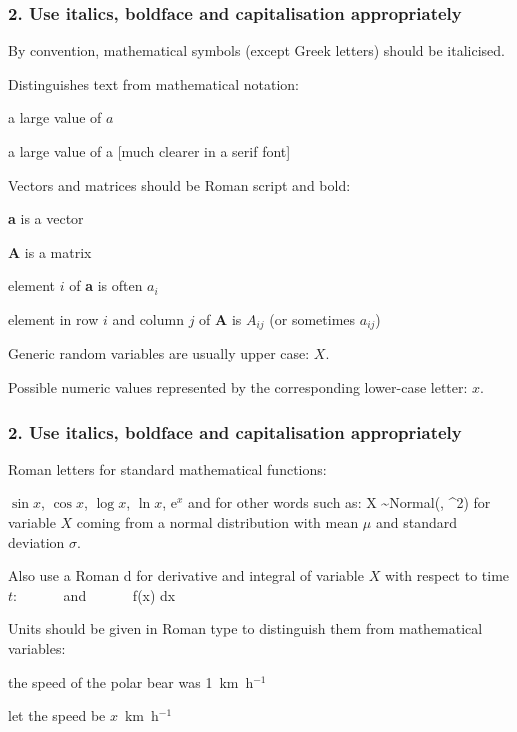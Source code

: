 

\begin{frame}
\frametitle{2. Use italics, boldface and capitalisation appropriately}

By convention, mathematical symbols (except Greek letters) should be italicised.

Distinguishes text from mathematical notation:

\bi
\item a large value of $a$
\item a large value of a [much clearer in a serif font]
\ei

\pause

Vectors and matrices should be Roman script and bold:
\bi
\item {\bf a} is a vector
\item {\bf A} is a matrix
\item element $i$ of {\bf a} is often $a_i$
\item element in row $i$ and column $j$ of {\bf A} is  $A_{ij}$ (or sometimes
  $a_{ij}$)
\ei


Generic random variables are usually upper case:  $X$.

Possible numeric values represented by the corresponding lower-case letter: $x$.
\end{frame}



\begin{frame}
\frametitle{2. Use italics, boldface and capitalisation appropriately}

Roman letters for standard mathematical functions:
\bi
\item $\sin x$, $\cos x$, $\log x$, $\ln x$, e$^x$
\ei
and for other words such as:
\eb
\nonumber X \sim \mbox{Normal}(\mu, \sigma^2)
\label{Xnormal}
\ee
\pause
for variable $X$ coming from a normal distribution with mean $\mu$ and
standard deviation $\sigma$.
\pause

\medskip
Also use a Roman d for derivative and integral of variable $X$ with respect to time $t$:
\eb
\nonumber {} ~~~~~~\mbox{and}~~~~~~ \int f(x) \mbox{d}x
\ee

\pause
\medskip

Units should be given in Roman type to distinguish them from mathematical variables:
\bi
\item the speed of the polar bear was 1~km~h$^{-1}$
\item let the speed be $x$~km~h$^{-1}$
\ei

\end{frame}

